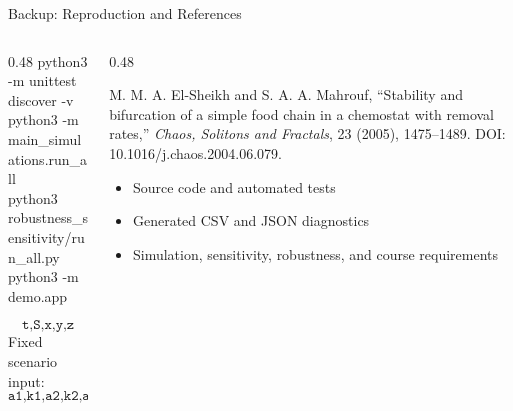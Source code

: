\begin{frame}{Backup: Reproduction and References}
  \begin{columns}[T,onlytextwidth]
    \begin{column}{0.48\textwidth}
      {\fontsize{9}{11}\selectfont\ttfamily
        python3 -m unittest discover -v\\[0.12cm]
        python3 -m main\_simulations.run\_all\\[0.12cm]
        python3 robustness\_sensitivity/run\_all.py\\[0.12cm]
        python3 -m demo.app
      }

      \vspace{0.35cm}
      \[
        \texttt{t,S,x,y,z}
      \]
      Fixed scenario input:
      \[
        \texttt{a1,k1,a2,k2,a3,k3,D1,D2,D3}
      \]
    \end{column}
    \begin{column}{0.48\textwidth}

      {\fontsize{10}{13}\selectfont
      M. M. A. El-Sheikh and S. A. A. Mahrouf,
      ``Stability and bifurcation of a simple food chain in a chemostat with
      removal rates,'' \emph{Chaos, Solitons and Fractals}, 23 (2005),
      1475--1489. DOI: 10.1016/j.chaos.2004.06.079.}

      \vspace{0.35cm}
      \begin{itemize}
        \item Source code and automated tests
        \item Generated CSV and JSON diagnostics
        \item Simulation, sensitivity, robustness, and course requirements
      \end{itemize}
    \end{column}
  \end{columns}
\end{frame}

\backupend
